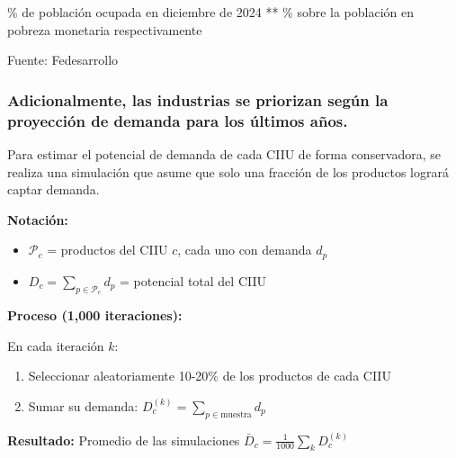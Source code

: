 \documentclass[aspectratio=169,xcolor=dvipsnames]{beamer}
\begin{document}
\begin{frame}
\vspace{0.2cm}
{\scriptsize * \% de población ocupada en diciembre de 2024 \hspace{1cm} ** \% sobre la población en pobreza monetaria respectivamente}

\vspace{0.3cm}
{\footnotesize Fuente: Fedesarrollo}

\end{frame}

\begin{frame}
\frametitle{Adicionalmente, las industrias se priorizan según la proyección de demanda para los últimos años.}

Para estimar el potencial de demanda de cada CIIU de forma conservadora, se realiza una simulación que asume que solo una fracción de los productos logrará captar demanda.

\textbf{Notación:}
\begin{itemize}
    \item $\mathcal{P}_c$ = productos del CIIU $c$, cada uno con demanda $d_p$
    \item $D_c = \sum_{p \in \mathcal{P}_c} d_p$ = potencial total del CIIU
\end{itemize}

\textbf{Proceso (1,000 iteraciones):}

En cada iteración $k$:
\begin{enumerate}
    \item Seleccionar aleatoriamente 10-20\% de los productos de cada CIIU
    \item Sumar su demanda: \quad $D_c^{(k)} = \displaystyle\sum_{p \in \text{muestra}} d_p$
\end{enumerate}

\textbf{Resultado:} Promedio de las simulaciones $\bar{D}_c = \frac{1}{1000}\sum_{k} D_c^{(k)}$

\end{frame}
\end{document}
